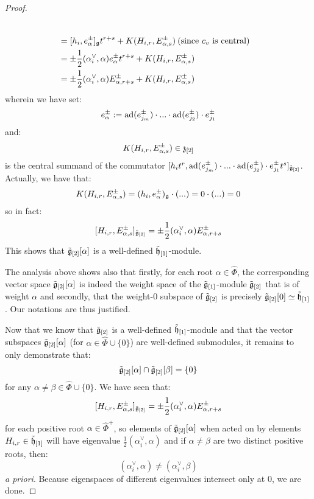 \begin{proof}
\begin{itemize}
$$\begin{aligned}
                                \\
                                & = [ h_i, e_{\alpha}^{\pm} ]_{\mathfrak{g}} t^{r + s} + K(H_{i, r}, E_{\alpha, s}^{\pm}) \: \text{(since $c_v$ is central)}
                                \\
                                & = \pm \frac12 (\alpha_i^{\vee}, \alpha) e_{\alpha}^{\pm} t^{r + s} + K(H_{i, r}, E_{\alpha, s}^{\pm})
                                \\
                                & = \pm \frac12 (\alpha_i^{\vee}, \alpha) E_{\alpha, r + s}^{\pm} + K(H_{i, r}, E_{\alpha, s}^{\pm})
                            \end{aligned}
                        $$
                    wherein we have set:
                        $$e_{\alpha}^{\pm} := \mathrm{ad}(e_{j_m}^{\pm}) \cdot ... \cdot \mathrm{ad}(e_{j_2}^{\pm}) \cdot e_{j_1}^{\pm}$$
                    and:
                        $$K(H_{i, r}, E_{\alpha, s}^{\pm}) \in \mathfrak{z}_{[2]}$$
                    is the central summand of the commutator $[ h_i t^r, \mathrm{ad}(e_{j_m}^{\pm}) \cdot ... \cdot \mathrm{ad}(e_{j_2}^{\pm}) \cdot e_{j_1}^{\pm} t^s ]_{\tilde{\mathfrak{g}}_{[2]}}$. Actually, we have that:
                        $$K(H_{i, r}, E_{\alpha, s}^{\pm}) = (h_i, e_{\alpha}^{\pm})_{\mathfrak{g}} \cdot (...) = 0 \cdot (...) = 0$$
                    so in fact:
                        $$[H_{i, r}, E_{\alpha, s}^{\pm}]_{\tilde{\mathfrak{g}}_{[2]}} = \pm \frac12 (\alpha_i^{\vee}, \alpha) E_{\alpha, r + s}^{\pm}$$
                    This shows that $\tilde{\mathfrak{g}}_{[2]}[\alpha]$ is a well-defined $\tilde{\mathfrak{h}}_{[1]}$-module. 
                \end{itemize}

                The analysis above shows also that firstly, for each root $\alpha \in \hat{\Phi}$, the corresponding vector space $\tilde{\mathfrak{g}}_{[2]}[\alpha]$ is indeed the weight space of the $\tilde{\mathfrak{g}}_{[1]}$-module $\tilde{\mathfrak{g}}_{[2]}$ that is of weight $\alpha$ and secondly, that the weight-$0$ subspace of $\tilde{\mathfrak{g}}_{[2]}$ is precisely $\tilde{\mathfrak{g}}_{[2]}[0] \simeq \tilde{\mathfrak{h}}_{[1]}$. Our notations are thus justified. 

                Now that we know that $\tilde{\mathfrak{g}}_{[2]}$ is a well-defined $\tilde{\mathfrak{h}}_{[1]}$-module and that the vector subspaces $\tilde{\mathfrak{g}}_{[2]}[\alpha]$ (for $\alpha \in \hat{\Phi} \cup \{0\}$) are well-defined submodules, it remains to only demonstrate that:
                    $$\tilde{\mathfrak{g}}_{[2]}[\alpha] \cap \tilde{\mathfrak{g}}_{[2]}[\beta] = \{0\}$$
                for any $\alpha \not = \beta \in \hat{\Phi} \cup \{0\}$. We have seen that:
                    $$[H_{i, r}, E_{\alpha, s}^{\pm}]_{\tilde{\mathfrak{g}}_{[2]}} = \pm \frac12 (\alpha_i^{\vee}, \alpha) E_{\alpha, r + s}^{\pm}$$
                for each positive root $\alpha \in \hat{\Phi}^+$, so elements of $\tilde{\mathfrak{g}}_{[2]}[\alpha]$ when acted on by elements $H_{i, r} \in \tilde{\mathfrak{h}}_{[1]}$ will have eigenvalue $\frac12 (\alpha_i^{\vee}, \alpha)$ and if $\alpha \not = \beta$ are two distinct positive roots, then:
                    $$(\alpha_i^{\vee}, \alpha) \not = (\alpha_i^{\vee}, \beta)$$
                \textit{a priori}. Because eigenspaces of different eigenvalues intersect only at $0$, we are done.
            \end{proof}
